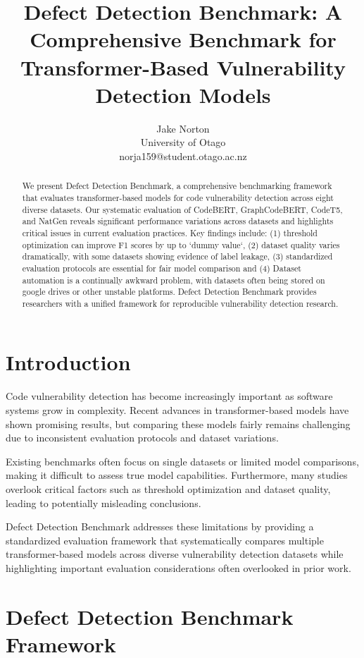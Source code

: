 \documentclass[letterpaper]{article}
\title{Defect Detection Benchmark: A Comprehensive Benchmark for Transformer-Based Vulnerability Detection Models}
\author{
Jake Norton\\
University of Otago\\
norja159@student.otago.ac.nz
}
\begin{document}
\maketitle

\begin{abstract}
	We present Defect Detection Benchmark, a comprehensive benchmarking framework that evaluates transformer-based models for code vulnerability detection across eight diverse datasets. Our systematic
	evaluation of CodeBERT, GraphCodeBERT, CodeT5, and NatGen reveals significant performance variations across datasets and highlights critical issues in current evaluation practices. Key findings
	include: (1) threshold optimization can improve F1 scores by up to `dummy value`, (2) dataset quality varies dramatically, with some datasets showing evidence of label leakage, (3) standardized evaluation
	protocols are essential for fair model comparison and (4) Dataset automation is a continually awkward problem, with datasets often being stored on google drives or other unstable platforms. Defect
	Detection Benchmark provides researchers with a unified framework for reproducible vulnerability detection research.
\end{abstract}

\section{Introduction}

Code vulnerability detection has become increasingly important as software systems grow in complexity. Recent advances in transformer-based models have shown promising results, but comparing these models fairly remains challenging due to inconsistent evaluation protocols and dataset variations.

Existing benchmarks often focus on single datasets or limited model comparisons, making it difficult to assess true model capabilities. Furthermore, many studies overlook critical factors such as threshold optimization and dataset quality, leading to potentially misleading conclusions.

Defect Detection Benchmark addresses these limitations by providing a standardized evaluation framework that systematically compares multiple transformer-based models across diverse vulnerability detection datasets while highlighting important evaluation considerations often overlooked in prior work.

\section{Defect Detection Benchmark Framework}
\end{document}
